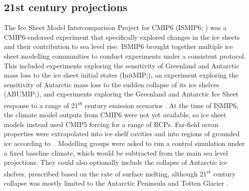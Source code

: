 \subsection{21st century projections}


The Ice Sheet Model Intercomparison Project for CMIP6 (ISMIP6; \citealt{nowickiIceSheetModel2016}) was a CMIP6-endorsed experiment that specifically explored changes in the ice sheets and their contribution to sea level rise. ISMIP6 brought together multiple ice sheet modelling communities to conduct experiments under a consistent protocol. This included experiments exploring the sensitivity of Greenland and Antarctic mass loss to the ice sheet initial states (InitMIP;\@ \citealt{goelzerDesignResultsIce2018,seroussiInitMIPAntarcticaIceSheet2019}), an experiment exploring the sensitivity of Antarctic mass loss to the sudden collapse of its ice shelves (ABUMIP;\@ \citealt{sunAntarcticIceSheet2020}), and experiments exploring the Greenland and Antarctic Ice Sheet response to a range of 21\textsuperscript{st} century emission scenarios \citep{payneFutureSeaLevel2021}. At the time of ISMIP6, the climate model outputs from CMIP6 were not yet available, so ice sheet models instead used CMIP5 forcing for a range of RCPs. Far-field ocean properties were extrapolated into ice shelf cavities and into regions of grounded ice according to~\cite{jourdainProtocolCalculatingBasal2020b}. Modelling groups were asked to run a control simulation under a fixed baseline climate, which would be subtracted from the main sea level projections. They could also optionally include the collapse of Antarctic ice shelves, prescribed based on the rate of surface melting, although 21\textsuperscript{st} century collapse was mostly limited to the Antarctic Peninsula and Totten Glacier \citep{seroussiISMIP6AntarcticaMultimodel2020}.

